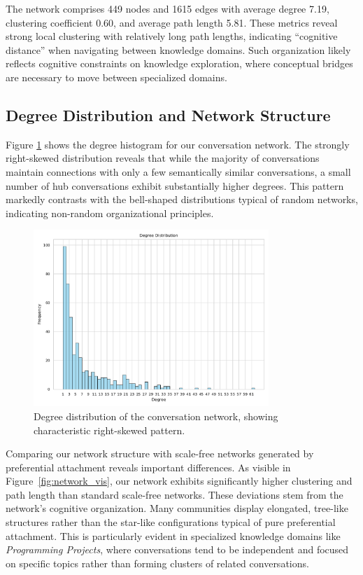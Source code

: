 \documentclass{svproc}
\begin{document}
The network comprises 449 nodes and 1615 edges with average degree 7.19, clustering coefficient 0.60, and average path length 5.81. These metrics reveal strong local clustering with relatively long path lengths, indicating ``cognitive distance'' when navigating between knowledge domains. Such organization likely reflects cognitive constraints on knowledge exploration, where conceptual bridges are necessary to move between specialized domains.

 

\subsection{Degree Distribution and Network Structure}

Figure \ref{fig:degree_hist} shows the degree histogram for our conversation network. The strongly right-skewed distribution reveals that while the majority of conversations maintain connections with only a few semantically similar conversations, a small number of hub conversations exhibit substantially higher degrees. This pattern markedly contrasts with the bell-shaped distributions typical of random networks, indicating non-random organizational principles.

\begin{figure}[!htbp]
\centering
\includegraphics[width=3.5in]{./images/degree_distribution_histogram.pdf}
\caption{Degree distribution of the conversation network, showing characteristic right-skewed pattern.}
\label{fig:degree_hist}
\end{figure}

Comparing our network structure with scale-free networks generated by preferential attachment reveals important differences. As visible in Figure~\ref{fig:network_vis}, our network exhibits significantly higher clustering and path length than standard scale-free networks. These deviations stem from the network's cognitive organization. Many communities display elongated, tree-like structures rather than the star-like configurations typical of pure preferential attachment. This is particularly evident in specialized knowledge domains like \emph{Programming Projects}, where conversations tend to be independent and focused on specific topics rather than forming clusters of related conversations.
\end{document}

